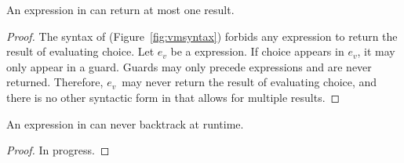 \documentclass[manuscript,screen,review, 12pt, nonacm]{acmart}
\begin{document}
      \begin{lemma}
        An expression in \VMinus can return at most one result. 
      \end{lemma}

      \newcommand\ev{\ensuremath{e_{v}}\xspace}
      \begin{proof}
        The syntax of \VMinus (Figure~\ref{fig:vmsyntax}) forbids any expression
        to return the result of evaluating choice. Let \ev be a \VMinus
        expression. If choice appears in \ev, it may only appear in a guard.
        Guards may only precede expressions and are never returned. Therefore,
        \ev\ may never return the result of evaluating choice, and there is no
        other syntactic form in \VMinus that allows for multiple results. 

      \end{proof}

      \begin{lemma}
        An expression in \VMinus can never backtrack at runtime. 
      \end{lemma}
      \begin{proof}
        In progress. 
      \end{proof}

        
        

\end{document}
